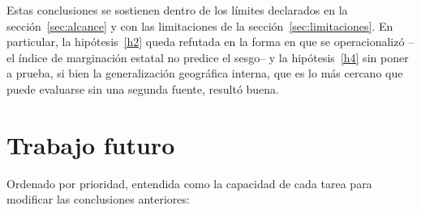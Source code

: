 Estas conclusiones se sostienen dentro de los límites declarados en la
sección~\ref{sec:alcance} y con las limitaciones de la
sección~\ref{sec:limitaciones}. En particular, la hipótesis~\ref{h2} queda
refutada en la forma en que se operacionalizó --el índice de marginación estatal
no predice el sesgo-- y la hipótesis~\ref{h4} sin poner a prueba, si bien la
generalización geográfica interna, que es lo más cercano que puede evaluarse sin
una segunda fuente, resultó buena.

\section{Trabajo futuro}
\label{sec:trabajo_futuro}

Ordenado por prioridad, entendida como la capacidad de cada tarea para modificar
las conclusiones anteriores:

